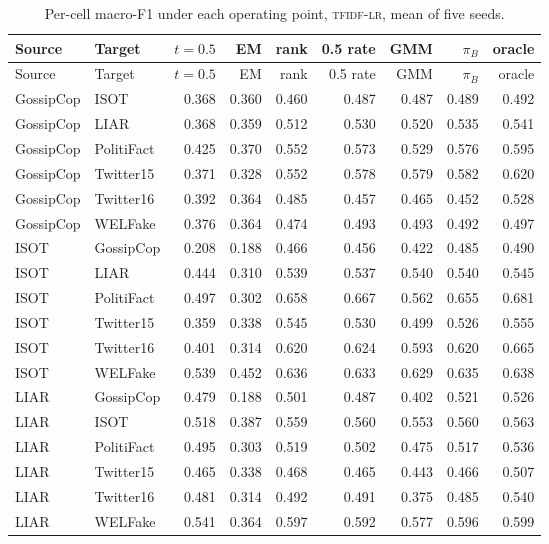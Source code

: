 \begin{longtable}{@{}llrrrrrrr@{}}
\caption{Per-cell macro-F1 under each operating point, \textsc{tfidf-lr}, mean of five seeds.}\label{tab:supp-op}\\
\toprule
Source & Target & $t=0.5$ & EM & rank & 0.5 rate & GMM & $\pi_B$ & oracle \\
\midrule
\endfirsthead
\toprule
Source & Target & $t=0.5$ & EM & rank & 0.5 rate & GMM & $\pi_B$ & oracle \\
\midrule
\endhead
GossipCop & ISOT & 0.368 & 0.360 & 0.460 & 0.487 & 0.487 & 0.489 & 0.492 \\
GossipCop & LIAR & 0.368 & 0.359 & 0.512 & 0.530 & 0.520 & 0.535 & 0.541 \\
GossipCop & PolitiFact & 0.425 & 0.370 & 0.552 & 0.573 & 0.529 & 0.576 & 0.595 \\
GossipCop & Twitter15 & 0.371 & 0.328 & 0.552 & 0.578 & 0.579 & 0.582 & 0.620 \\
GossipCop & Twitter16 & 0.392 & 0.364 & 0.485 & 0.457 & 0.465 & 0.452 & 0.528 \\
GossipCop & WELFake & 0.376 & 0.364 & 0.474 & 0.493 & 0.493 & 0.492 & 0.497 \\
ISOT & GossipCop & 0.208 & 0.188 & 0.466 & 0.456 & 0.422 & 0.485 & 0.490 \\
ISOT & LIAR & 0.444 & 0.310 & 0.539 & 0.537 & 0.540 & 0.540 & 0.545 \\
ISOT & PolitiFact & 0.497 & 0.302 & 0.658 & 0.667 & 0.562 & 0.655 & 0.681 \\
ISOT & Twitter15 & 0.359 & 0.338 & 0.545 & 0.530 & 0.499 & 0.526 & 0.555 \\
ISOT & Twitter16 & 0.401 & 0.314 & 0.620 & 0.624 & 0.593 & 0.620 & 0.665 \\
ISOT & WELFake & 0.539 & 0.452 & 0.636 & 0.633 & 0.629 & 0.635 & 0.638 \\
LIAR & GossipCop & 0.479 & 0.188 & 0.501 & 0.487 & 0.402 & 0.521 & 0.526 \\
LIAR & ISOT & 0.518 & 0.387 & 0.559 & 0.560 & 0.553 & 0.560 & 0.563 \\
LIAR & PolitiFact & 0.495 & 0.303 & 0.519 & 0.502 & 0.475 & 0.517 & 0.536 \\
LIAR & Twitter15 & 0.465 & 0.338 & 0.468 & 0.465 & 0.443 & 0.466 & 0.507 \\
LIAR & Twitter16 & 0.481 & 0.314 & 0.492 & 0.491 & 0.375 & 0.485 & 0.540 \\
LIAR & WELFake & 0.541 & 0.364 & 0.597 & 0.592 & 0.577 & 0.596 & 0.599 \\

\end{longtable}
